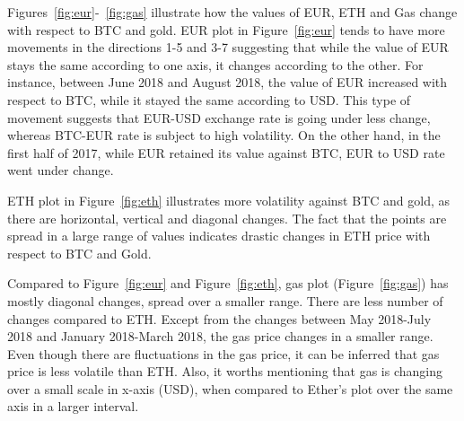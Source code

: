 




Figures~\ref{fig:eur}-~\ref{fig:gas} illustrate how the values of EUR, ETH and Gas change with respect to BTC and gold. EUR plot in Figure~\ref{fig:eur} tends to have more movements in the directions 1-5 and 3-7 suggesting that while the value of EUR stays the same according to one axis, it changes according to the other. For instance, between June 2018 and August 2018, the value of EUR increased with respect to BTC, while it stayed the same according to USD. This type of movement suggests that EUR-USD exchange rate is going under less change, whereas BTC-EUR rate is subject to high volatility. On the other hand, in the first half of 2017, while EUR retained its value against BTC, EUR to USD rate went under change.

ETH plot in Figure~\ref{fig:eth} illustrates more volatility against BTC and gold, as there are horizontal, vertical and diagonal changes. The fact that the points are spread in a large range of values indicates drastic changes in ETH price with respect to BTC and Gold.

Compared to Figure~\ref{fig:eur} and Figure~\ref{fig:eth}, gas plot (Figure~\ref{fig:gas}) has mostly diagonal changes, spread over a smaller range. There are less number of changes compared to ETH. Except from the changes between May 2018-July 2018 and January 2018-March 2018, the gas price changes in a smaller range. Even though there are fluctuations in the gas price, it can be inferred that gas price is less volatile than ETH. Also, it worths mentioning that gas is changing over a small scale in x-axis (USD), when compared to Ether's plot over the same axis in a larger interval.



